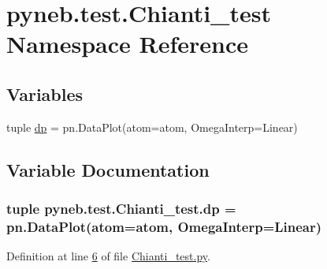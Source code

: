 \hypertarget{namespacepyneb_1_1test_1_1_chianti__test}{}\section{pyneb.\+test.\+Chianti\+\_\+test Namespace Reference}
\label{namespacepyneb_1_1test_1_1_chianti__test}
\subsection*{Variables}
\begin{DoxyCompactItemize}
\item 
tuple \hyperlink{namespacepyneb_1_1test_1_1_chianti__test_a19b19443ce67bd7f26c80fa05c0626ad}{dp} = pn.\+Data\+Plot(atom=atom, Omega\+Interp=\textquotesingle{}Linear\textquotesingle{})
\end{DoxyCompactItemize}


\subsection{Variable Documentation}
\hypertarget{namespacepyneb_1_1test_1_1_chianti__test_a19b19443ce67bd7f26c80fa05c0626ad}{}
\subsubsection[{dp}]{\setlength{\rightskip}{0pt plus 5cm}tuple pyneb.\+test.\+Chianti\+\_\+test.\+dp = pn.\+Data\+Plot(atom=atom, Omega\+Interp=\textquotesingle{}Linear\textquotesingle{})}\label{namespacepyneb_1_1test_1_1_chianti__test_a19b19443ce67bd7f26c80fa05c0626ad}


Definition at line \hyperlink{_chianti__test_8py_source_l00006}{6} of file \hyperlink{_chianti__test_8py_source}{Chianti\+\_\+test.\+py}.

